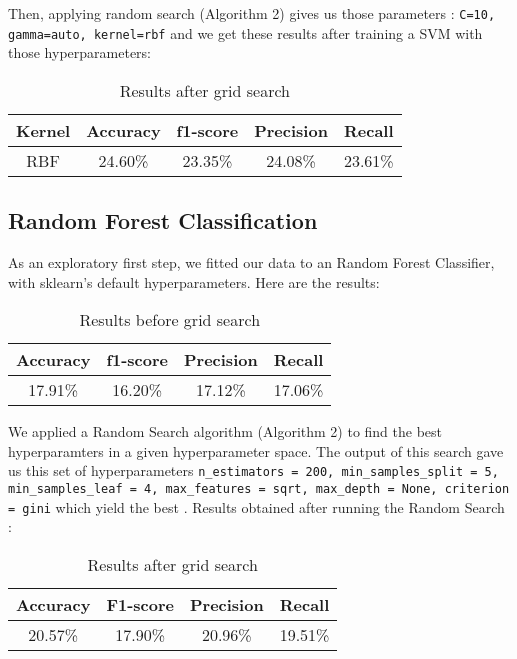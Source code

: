 \documentclass[twocolumn]{article}
\begin{document}
Then, applying random search (Algorithm 2) gives us those parameters : \texttt{C=10, gamma=auto, kernel=rbf} and we get these results after training a SVM with those hyperparameters:


\begin{table}[h]
    \centering
    \begin{tabular}{|c|c|c|c|c|}
    \hline
      Kernel & Accuracy & f1-score & Precision & Recall \\
      \hline
      RBF & 24.60\% & 23.35\% & 24.08\% & 23.61\% \\
    \hline
    \end{tabular}

    \label{tab:my_label}
    \caption{Results after grid search}
\end{table}

\subsection{Random Forest Classification}
As an exploratory first step, we fitted our data to an Random Forest Classifier, with sklearn's default hyperparameters. Here are the results:

\begin{table}[h]
    \centering
    \begin{tabular}{|c|c|c|c|}
    \hline
      Accuracy & f1-score & Precision & Recall \\
      \hline
      17.91\% & 16.20\% & 17.12\% & 17.06\% \\
    \hline
    \end{tabular}

    \label{tab:my_label}
    \caption{Results before grid search}
\end{table}

We applied a Random Search algorithm (Algorithm 2) to find the best hyperparamters in a given hyperparameter space. The output of this search gave us this set of hyperparameters \texttt{n\_estimators = 200, min\_samples\_split = 5, min\_samples\_leaf = 4, max\_features = sqrt, max\_depth = None, criterion = gini} which yield the best . Results obtained after running the Random Search : 

\begin{table}[!h]
    \centering
    \begin{tabular}{|c|c|c|c|}
        \hline
         Accuracy & F1-score & Precision & Recall\\
        \hline
         20.57\% & 17.90\% & 20.96\% & 19.51\%\\
        \hline
    \end{tabular}
    
    \label{tab:my_label}
    \caption{Results after grid search}
\end{table}
\end{document}
